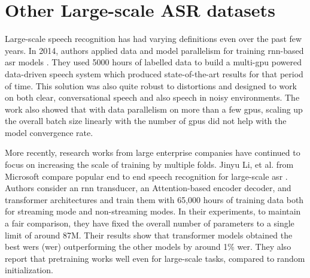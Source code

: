 \section{Other Large-scale ASR datasets}
\label{section:largescale_related}
Large-scale speech recognition has had varying definitions even over the past few years. In 2014, authors applied data and model parallelism for training \acrshort{rnn}-based \acrshort{asr} models \cite{Hannun2014DeepRecognition}. They used 5000 hours of labelled data to build a multi-\acrshort{gpu} powered data-driven speech system which produced state-of-the-art results for that period of time. This solution was also quite robust to distortions and designed to work on both clear, conversational speech and also speech in noisy environments. The work also showed that with data parallelism on more than a few \acrshort{gpu}s, scaling up the overall batch size linearly with the number of \acrshort{gpu}s did not help with the model convergence rate.

More recently, research works from large enterprise companies have continued to focus on increasing the scale of training by multiple folds. Jinyu Li, et al. from Microsoft compare popular end to end speech recognition for large-scale \acrshort{asr} \cite{Li2020OnRecognition}. Authors consider an \acrshort{rnn} transducer, an Attention-based encoder decoder, and transformer architectures and train them with 65,000 hours of training data both for streaming mode and non-streaming modes. In their experiments, to maintain a fair comparison, they have fixed the overall number of parameters to a single limit of around 87M. Their results show that transformer models obtained the best \acrlong{wer}s (\acrshort{wer}) outperforming the other models by around 1\% \acrshort{wer}. They also report that pretraining works well even for large-scale tasks, compared to random initialization.

